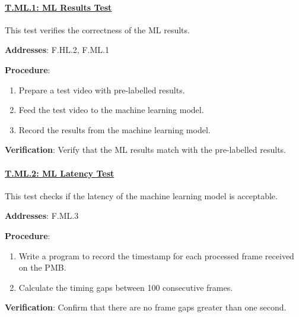 \paragraph{\underline{T.ML.1: ML Results Test}}

This test verifies the correctness of the ML results.

\textbf{Addresses}: F.HL.2, F.ML.1

\textbf{Procedure}:
\begin{enumerate}[noitemsep]
    \item Prepare a test video with pre-labelled results.
    \item Feed the test video to the machine learning model.
    \item Record the results from the machine learning model.
\end{enumerate}

\textbf{Verification}: 
Verify that the ML results match with the pre-labelled results.

%

\paragraph{\underline{T.ML.2: ML Latency Test}}

This test checks if the latency of the machine learning model is acceptable.

\textbf{Addresses}: F.ML.3

\textbf{Procedure}:
\begin{enumerate}[noitemsep]
    \item Write a program to record the timestamp for each processed frame received on the PMB.
    \item Calculate the timing gaps between 100 consecutive frames.
\end{enumerate}

\textbf{Verification}: 
Confirm that there are no frame gaps greater than one second.
